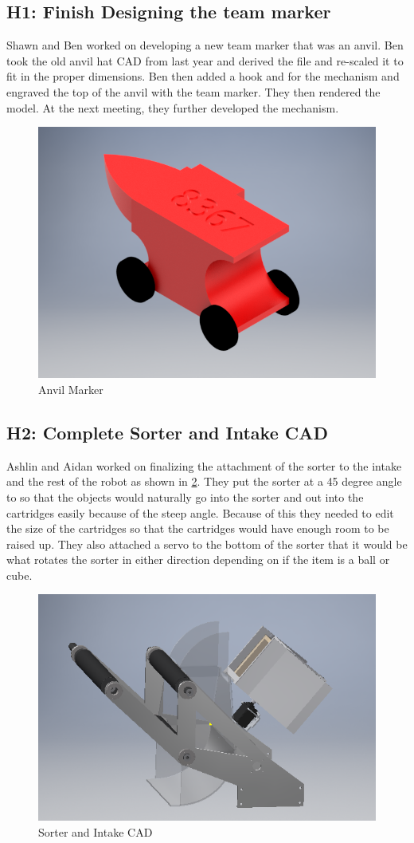 \documentclass{article}
\begin{document}
\subsection{H1: Finish Designing the team marker}

Shawn and Ben worked on developing a new team marker that was an anvil. Ben took the old anvil hat CAD from last year and derived the file and re-scaled it to fit in the proper dimensions. Ben then added a hook and for the mechanism and engraved the top of the anvil with the team marker. They then rendered the model. At the next meeting, they further developed the mechanism.

\begin{figure}
    \centering
    \includegraphics[width=.6 \textwidth]{07_10-15/images/REAL_anvil_marker.png}
    \caption{Anvil Marker}
    \label{fig:marker}
\end{figure}

\subsection{H2: Complete Sorter and Intake CAD}

Ashlin and Aidan worked on finalizing the attachment of the sorter to the intake and the rest of the robot as shown in \ref{fig:Intake CAD}. They put the sorter at a 45 degree angle to so that the objects would naturally go into the sorter and out into the cartridges easily because of the steep angle. Because of this they needed to edit the size of the cartridges so that the cartridges would have enough room to be raised up. They also attached a servo to the bottom of the sorter that it would be what rotates the sorter in either direction depending on if the item is a ball or cube.

\begin{figure}
    \centering
    \includegraphics[width=.6 \textwidth]{07_10-15/images/IntakeCAD.png}
    \caption{Sorter and Intake CAD}
    \label{fig:Intake CAD}
\end{figure}
\end{document}
